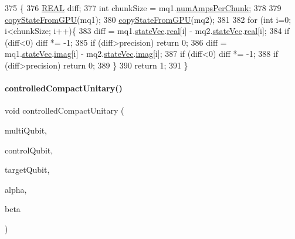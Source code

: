 \begin{DoxyCode}
375                                                                  \{
376     \mbox{\hyperlink{QuEST__precision_8h_a4b654506f18b8bfd61ad2a29a7e38c25}{REAL}} diff;
377     \textcolor{keywordtype}{int} chunkSize = mq1.\mbox{\hyperlink{structMultiQubit_a1cad83601a78635dd278259c7ed54f18}{numAmpsPerChunk}};
378 
379     \mbox{\hyperlink{QuEST__env__localGPU_8cu_a0d255fec1e375244d4cb980fac92621d}{copyStateFromGPU}}(mq1);
380     \mbox{\hyperlink{QuEST__env__localGPU_8cu_a0d255fec1e375244d4cb980fac92621d}{copyStateFromGPU}}(mq2);
381 
382     \textcolor{keywordflow}{for} (\textcolor{keywordtype}{int} i=0; i<chunkSize; i++)\{
383         diff = mq1.\mbox{\hyperlink{structMultiQubit_a45483190d6b01ef6b2f98f2bec9ab94f}{stateVec}}.\mbox{\hyperlink{structComplexArray_a4195cac6c784ea1b6271f1c7dba1548a}{real}}[i] - mq2.\mbox{\hyperlink{structMultiQubit_a45483190d6b01ef6b2f98f2bec9ab94f}{stateVec}}.\mbox{\hyperlink{structComplexArray_a4195cac6c784ea1b6271f1c7dba1548a}{real}}[i];
384         \textcolor{keywordflow}{if} (diff<0) diff *= -1;
385         \textcolor{keywordflow}{if} (diff>precision) \textcolor{keywordflow}{return} 0;
386         diff = mq1.\mbox{\hyperlink{structMultiQubit_a45483190d6b01ef6b2f98f2bec9ab94f}{stateVec}}.\mbox{\hyperlink{structComplexArray_a79dde47c7ae530c79cebfdf57b225968}{imag}}[i] - mq2.\mbox{\hyperlink{structMultiQubit_a45483190d6b01ef6b2f98f2bec9ab94f}{stateVec}}.\mbox{\hyperlink{structComplexArray_a79dde47c7ae530c79cebfdf57b225968}{imag}}[i];
387         \textcolor{keywordflow}{if} (diff<0) diff *= -1;
388         \textcolor{keywordflow}{if} (diff>precision) \textcolor{keywordflow}{return} 0;
389     \}
390     \textcolor{keywordflow}{return} 1;
391 \}
\end{DoxyCode}
\mbox{\label{QuEST__env__localGPU_8cu_ab4812953bc457405b3aa05a4c2f64f4a}} 
\paragraph{\texorpdfstring{controlled\+Compact\+Unitary()}{controlledCompactUnitary()}}
{\footnotesize\ttfamily void controlled\+Compact\+Unitary (\begin{DoxyParamCaption}\item[{\mbox{\hyperlink{structMultiQubit}{Multi\+Qubit}}}]{multi\+Qubit,  }\item[{const int}]{control\+Qubit,  }\item[{const int}]{target\+Qubit,  }\item[{\mbox{\hyperlink{structComplex}{Complex}}}]{alpha,  }\item[{\mbox{\hyperlink{structComplex}{Complex}}}]{beta }\end{DoxyParamCaption})}



